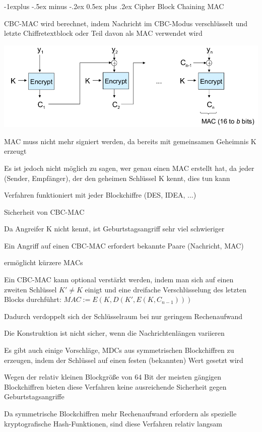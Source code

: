 \documentclass[a4paper]{article}
\makeatletter
\renewcommand{\subsection}{\@startsection{subsection}{2}{0mm}%
 {-1explus -.5ex minus -.2ex}%
 {0.5ex plus .2ex}%
 {\normalfont\normalsize\bfseries}}
\makeatother
\begin{document}
\begin{multicols}{3}
      \subsection{Cipher Block Chaining MAC}
      \begin{itemize*}
            \item CBC-MAC wird berechnet, indem Nachricht im CBC-Modus verschlüsselt und letzte Chiffretextblock oder Teil davon als MAC verwendet wird
            \item \includegraphics[width=.5\linewidth]{Assets/NetworkSecurity-CBC-mac.png}
            \item MAC muss nicht mehr signiert werden, da bereits mit gemeinsamen Geheimnis K erzeugt
            \item Es ist jedoch nicht möglich zu sagen, wer genau einen MAC erstellt hat, da jeder (Sender, Empfänger), der den geheimen Schlüssel K kennt, dies tun kann
            \item Verfahren funktioniert mit jeder Blockchiffre (DES, IDEA, ...)
            \item Sicherheit von CBC-MAC
            \begin{itemize*}
                  \item Da Angreifer K nicht kennt, ist Geburtstagsangriff sehr viel schwieriger
                  \item Ein Angriff auf einen CBC-MAC erfordert bekannte Paare (Nachricht, MAC)
                  \item ermöglicht kürzere MACs
                  \item Ein CBC-MAC kann optional verstärkt werden, indem man sich auf einen zweiten Schlüssel $K'\not= K$ einigt und eine dreifache Verschlüsselung des letzten Blocks durchführt: $MAC:=E(K,D(K',E(K,C_{n-1})))$
                  \item Dadurch verdoppelt sich der Schlüsselraum bei nur geringem Rechenaufwand
                  \item Die Konstruktion ist nicht sicher, wenn die Nachrichtenlängen variieren
            \end{itemize*}
            \item Es gibt auch einige Vorschläge, MDCs aus symmetrischen Blockchiffren zu erzeugen, indem der Schlüssel auf einen festen (bekannten) Wert gesetzt wird
            \begin{itemize*}
                  \item Wegen der relativ kleinen Blockgröße von 64 Bit der meisten gängigen Blockchiffren bieten diese Verfahren keine ausreichende Sicherheit gegen Geburtstagsangriffe
                  \item Da symmetrische Blockchiffren mehr Rechenaufwand erfordern als spezielle kryptografische Hash-Funktionen, sind diese Verfahren relativ langsam
            \end{itemize*}
      \end{itemize*}


\end{multicols}
\end{document}
